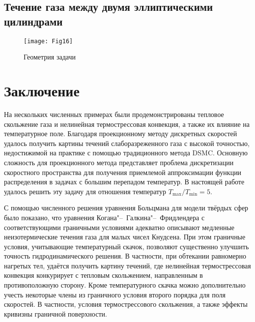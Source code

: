 \documentclass[
aps,%
12pt,%
final,%
notitlepage,%
oneside,%
onecolumn,%
nobibnotes,%
nofootinbib,%
superscriptaddress,%
noshowpacs,%
showkeys,%
centertags]%
{revtex4}
\begin{document}
\subsection{Течение газа между двумя эллиптическими цилиндрами}

\begin{wrapfigure}{r}{7.4cm}
    \vspace{-10pt}
    \centering
    \texttt{[image: Fig16]}
    \vspace{-20pt}
    \caption{Геометрия задачи}\label{fig:elliptic}
    \vspace{20pt}
\end{wrapfigure}


\section{Заключение}

На нескольких численных примерах были продемонстрированы тепловое скольжение газа
и нелинейная термострессовая конвекция, а также их влияние на температурное поле.
Благодаря проекционному методу дискретных скоростей удалось получить картины течений
слаборазреженного газа с высокой точностью, недостижимой на практике с помощью традиционного метода DSMC.
Основную сложность для проекционного метода представляет проблема дискретизации скоростного пространства
для получения приемлемой аппроксимации функции распределения в задачах с большим перепадом температур.
В настоящей работе удалось решить эту задачу для отношения температур \(T_{\max}/T_{\min}=5\).

С помощью численного решения уравнения Больцмана для модели твёрдых сфер было показано,
что уравнения Когана"--~Галкина"--~Фридлендера с соответствующими граничными условиями адекватно описывают
медленные неизотермические течения газа для малых чисел Кнудсена.
При этом граничные условия, учитывающие температурный скачок, позволяют
существенно улучшить точность гидродинамического решения.
В частности, при обтекании равномерно нагретых тел, удаётся получить картину течений,
где нелинейная термострессовая конвекция конкурирует с тепловым скольжением,
направленным в противоположную сторону.
Кроме температурного скачка можно дополнительно учесть некоторые члены из граничного условия
второго порядка для поля скоростей. В частности, условия термострессового скольжения,
а также эффекты кривизны граничной поверхности.




\end{document}

